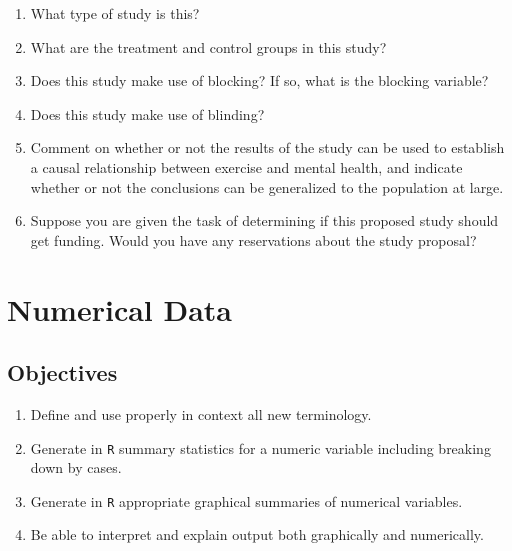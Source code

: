 \documentclass[
]{book}
\providecommand{\tightlist}{%
  \setlength{\itemsep}{0pt}\setlength{\parskip}{0pt}}
\begin{document}
\begin{enumerate}
\def\labelenumi{\alph{enumi}.}
\tightlist
\item
  What type of study is this?\\
\item
  What are the treatment and control groups in this study?\\
\item
  Does this study make use of blocking? If so, what is the blocking variable?\\
\item
  Does this study make use of blinding?\\
\item
  Comment on whether or not the results of the study can be used to establish a causal relationship between exercise and mental health, and indicate whether or not the conclusions can be generalized to the population at large.\\
\item
  Suppose you are given the task of determining if this proposed study should get funding. Would you have any reservations about the study proposal?
\end{enumerate}

\hypertarget{NUMDATA}{%
\chapter{Numerical Data}\label{NUMDATA}}

\hypertarget{objectives-4}{%
\section{Objectives}\label{objectives-4}}

\begin{enumerate}
\def\labelenumi{\arabic{enumi})}
\tightlist
\item
  Define and use properly in context all new terminology.\\
\item
  Generate in \texttt{R} summary statistics for a numeric variable including breaking down by cases.\\
\item
  Generate in \texttt{R} appropriate graphical summaries of numerical variables.\\
\item
  Be able to interpret and explain output both graphically and numerically.
\end{enumerate}
\end{document}
